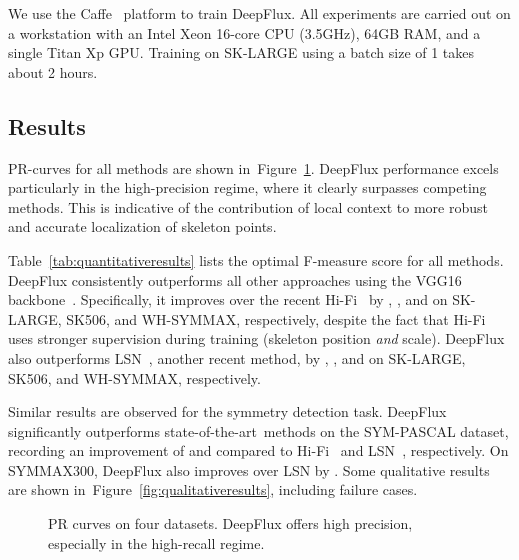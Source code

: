 \documentclass[10pt,twocolumn,letterpaper]{article}
\def\sota{state-of-the-art}
\newcommand{\reffig}[1]{Figure~\ref{#1}}
\newcommand{\reftab}[1]{Table~\ref{#1}}
\begin{document}
{We use the Caffe~\cite{jia2014caffe} platform to train DeepFlux. All experiments are carried out on a workstation with an Intel Xeon 16-core CPU (3.5GHz), 64GB RAM, and a single Titan Xp GPU.
Training on SK-LARGE using a batch size of 1 takes about 2 hours.





\subsection{Results} \label{sec:results}
PR-curves for all methods are shown in~\reffig{fig:prcurve}.
DeepFlux performance excels particularly in the high-precision regime, where it clearly surpasses competing methods.
This is indicative of the contribution of local context to more robust and accurate localization of skeleton points.

\reftab{tab:quantitativeresults} lists the optimal F-measure score for all methods.
DeepFlux consistently outperforms all other approaches using the VGG16 backbone~\cite{vgg16network}.
Specifically, it improves over the recent Hi-Fi~\cite{zhao2018hifi} by , , and  on SK-LARGE, SK506, and WH-SYMMAX, respectively, despite the fact that Hi-Fi uses stronger supervision during training (skeleton position \emph{and} scale).
DeepFlux also outperforms LSN~\cite{liu2018lsn}, another recent method, by , , and  on SK-LARGE, SK506, and WH-SYMMAX, respectively.

Similar results are observed for the symmetry detection task.
DeepFlux significantly outperforms \sota\ methods on the SYM-PASCAL dataset, recording an improvement of  and  compared to Hi-Fi~\cite{zhao2018hifi} and LSN~\cite{liu2018lsn}, respectively.
On SYMMAX300, DeepFlux also improves over LSN by .
Some qualitative results are shown in~\reffig{fig:qualitativeresults}, including failure cases.

\begin{figure} \centering
{}
\caption{PR curves on four datasets. DeepFlux offers high precision, especially in the high-recall regime.}
\label{fig:prcurve}
\end{figure}

}
\end{document}

